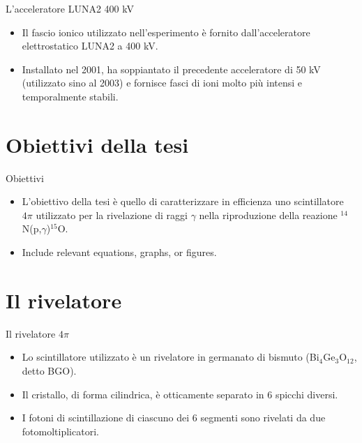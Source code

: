 \documentclass [xcolor=svgnames] {beamer}
\begin{document}
	\begin{frame}{L'acceleratore LUNA2 400 kV}
		\begin{itemize}
			\item Il fascio ionico utilizzato nell'esperimento è fornito dall'acceleratore elettrostatico LUNA2 a 400 kV.
			\item Installato nel 2001, ha soppiantato il precedente acceleratore di 50 kV (utilizzato sino al 2003) e fornisce fasci di ioni molto più intensi e temporalmente stabili.
		\end{itemize}
	\end{frame}
	
	\section{Obiettivi della tesi}
	\begin{frame}{Obiettivi}
		\begin{itemize}
			\item L'obiettivo della tesi è quello di caratterizzare in efficienza uno scintillatore $4\pi$ utilizzato per la rivelazione di raggi $\gamma$ nella riproduzione della reazione $^{14}$N(p,$\gamma$)$^{15}$O. 
			\item Include relevant equations, graphs, or figures.
		\end{itemize}
	\end{frame}
	
	\section{Il rivelatore}
	\begin{frame}{Il rivelatore $4\pi$}
		\begin{itemize}
			\item Lo scintillatore utilizzato è un rivelatore in germanato di bismuto (Bi$_{4}$Ge$_{3}$O$_{12}$, detto BGO).
			\item Il cristallo, di forma cilindrica, è otticamente separato in 6 spicchi diversi.
			\item I fotoni di scintillazione di ciascuno dei 6 segmenti sono rivelati da due fotomoltiplicatori.
		\end{itemize}
	\end{frame}
\end{document}
